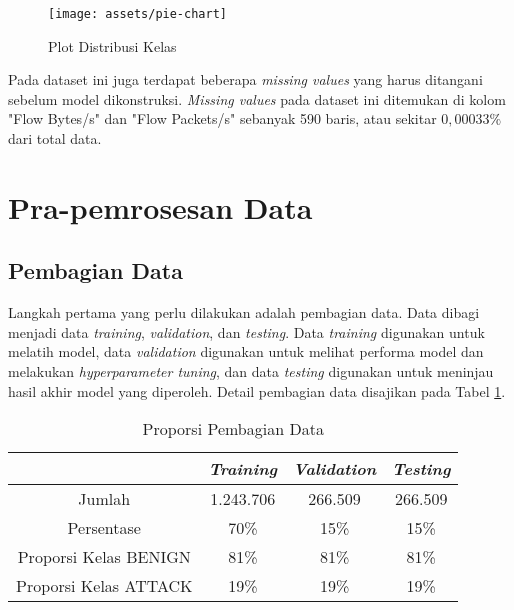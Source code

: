 \documentclass[a4paper,12pt]{report}
\begin{document}
\begin{figure}[H]
	\center \texttt{[image: assets/pie-chart]}
	\caption{Plot Distribusi Kelas} 
	\label{distribusi_kelas}
\end{figure}

Pada dataset ini juga terdapat beberapa \textit{missing values} yang harus ditangani sebelum model dikonstruksi. \textit{Missing values} pada dataset ini ditemukan di kolom "Flow Bytes/s" dan "Flow Packets/s" sebanyak 590 baris, atau sekitar $0,00033\%$ dari total data.

\section{Pra-pemrosesan Data}
\subsection{Pembagian Data}
Langkah pertama yang perlu dilakukan adalah pembagian data. Data dibagi menjadi data \textit{training}, \textit{validation}, dan \textit{testing}. Data \textit{training} digunakan untuk melatih model, data \textit{validation} digunakan untuk melihat performa model dan melakukan \textit{hyperparameter tuning}, dan data \textit{testing} digunakan untuk meninjau hasil akhir model yang diperoleh. Detail pembagian data disajikan pada Tabel \ref{pembagian_data}. 

\begin{table}[h!]
	\centering
	\caption{Proporsi Pembagian Data}
	\label{pembagian_data}
	\begin{tabular}{|c|c|c|c|}
		\hline
		& \textit{Training} & \textit{Validation} & \textit{Testing} \\
		\hline
		Jumlah & 1.243.706 & 266.509 & 266.509 \\
		\hline
		Persentase & 70\% & 15\% & 15\% \\
		\hline
		Proporsi Kelas BENIGN & 81\% & 81\% & 81\% \\
		\hline
		Proporsi Kelas ATTACK & 19\% & 19\% & 19\% \\
		\hline
	\end{tabular}
\end{table}
\end{document}
